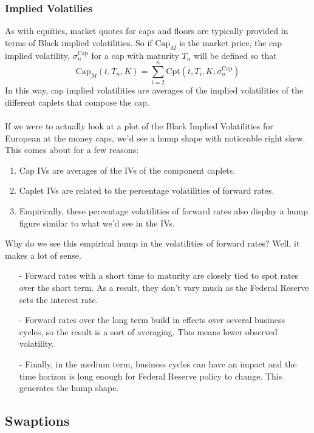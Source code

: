 \documentclass[a4paper,12pt]{scrartcl}
\begin{document}
\subsubsection{Implied Volatilies}
As with equities, market quotes for caps and floors are typically
provided in terms of Black implied volatilities. So if $\text{Cap}_M$ is
the market price, the cap implied volatility, $\sigma_n^{\text{Cap}}$ 
for a cap with maturity $T_n$ will be defined so that
   \[ \text{Cap}_M(t,T_n,K) = \sum^n_{i=2} \text{Cpt}(t,T_i, K; 
      \sigma^{\text{Cap}}_n) \]
In this way, cap implied volatilities are averages of the implied 
volatilities of the different caplets that compose the cap.
\\
\\
If we were to actually look at a plot of the Black Implied Volatilities
for European at the money caps, we'd see a hump shape with noticeable
right skew. This comes about for a few reasons:
\begin{enumerate}
   \item Cap IVs are averages of the IVs of the component caplets.
   \item Caplet IVs are related to the percentage volatilities of 
      forward rates.
   \item Empirically, these percentage volatilities of forward rates
      also display a hump figure similar to what we'd see in the IVs.
\end{enumerate}
Why do we see this empirical hump in the volatilities of forward rates?
Well, it makes a lot of sense.  
\begin{itemize}
   \item[-] Forward rates with a short time to 
      maturity are closely tied to spot rates over the short term. As a
      result, they don't vary much as the Federal Reserve sets the 
      interest rate.
   \item[-] Forward rates over the long term build in effects over 
      several business cycles, so the result is a sort of averaging.
      This means lower observed volatility.
   \item[-] Finally, in the medium term, business cycles can have an
      impact and the time horizon is long enough for Federal Reserve
      policy to change. This generates the hump shape.
\end{itemize}

\newpage
\subsection{Swaptions}
\end{document}
